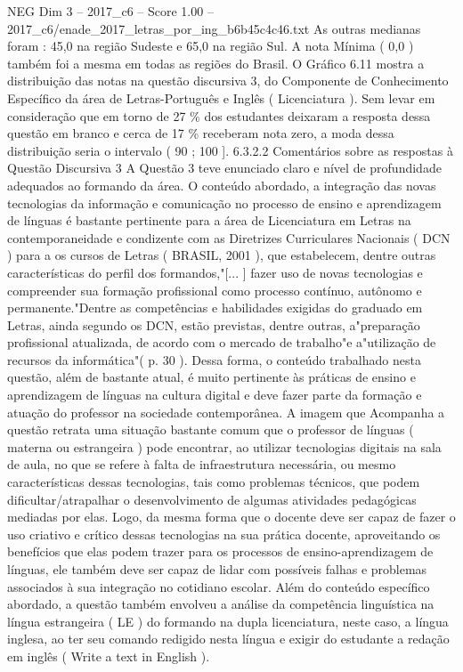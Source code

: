 \begin{textsample}{NEG Dim 3 – 2017\_c6 – Score 1.00 – 2017\_c6/enade\_2017\_letras\_por\_ing\_b6b45c4c46.txt}
As outras medianas foram : 45,0 na região Sudeste e 65,0 na região Sul.
A nota Mínima ( 0,0 ) também foi a mesma em todas as regiões do Brasil.
O Gráfico 6.11 mostra a distribuição das notas na questão discursiva 3, do Componente de Conhecimento Específico da área de Letras-Português e Inglês ( Licenciatura ).
Sem levar em consideração que em torno de 27 \% dos estudantes deixaram a resposta dessa questão em branco e cerca de 17 \% receberam nota zero, a moda dessa distribuição seria o intervalo ( 90 ; 100 ]. 6.3.2.2 Comentários sobre as respostas à Questão Discursiva 3 A Questão 3 teve enunciado claro e nível de profundidade adequados ao formando da área.
O conteúdo abordado, a integração das novas tecnologias da informação e comunicação no processo de ensino e aprendizagem de línguas é bastante pertinente para a área de Licenciatura em Letras na contemporaneidade e condizente com as Diretrizes Curriculares Nacionais ( DCN ) para a os cursos de Letras ( BRASIL, 2001 ), que estabelecem, dentre outras características do perfil dos formandos,"[... ] fazer uso de novas tecnologias e compreender sua formação profissional como processo contínuo, autônomo e permanente."Dentre as competências e habilidades exigidas do graduado em Letras, ainda segundo os DCN, estão previstas, dentre outras, a"preparação profissional atualizada, de acordo com o mercado de trabalho"e a"utilização de recursos da informática"( p. 30 ).
Dessa forma, o conteúdo trabalhado nesta questão, além de bastante atual, é muito pertinente às práticas de ensino e aprendizagem de línguas na cultura digital e deve fazer parte da formação e atuação do professor na sociedade contemporânea.
A imagem que Acompanha a questão retrata uma situação bastante comum que o professor de línguas ( materna ou estrangeira ) pode encontrar, ao utilizar tecnologias digitais na sala de aula, no que se refere à falta de infraestrutura necessária, ou mesmo características dessas tecnologias, tais como problemas técnicos, que podem dificultar/atrapalhar o desenvolvimento de algumas atividades pedagógicas mediadas por elas.
Logo, da mesma forma que o docente deve ser capaz de fazer o uso criativo e crítico dessas tecnologias na sua prática docente, aproveitando os benefícios que elas podem trazer para os processos de ensino-aprendizagem de línguas, ele também deve ser capaz de lidar com possíveis falhas e problemas associados à sua integração no cotidiano escolar.
Além do conteúdo específico abordado, a questão também envolveu a análise da competência linguística na língua estrangeira ( LE ) do formando na dupla licenciatura, neste caso, a língua inglesa, ao ter seu comando redigido nesta língua e exigir do estudante a redação em inglês ( Write a text in English ).

\end{textsample}
